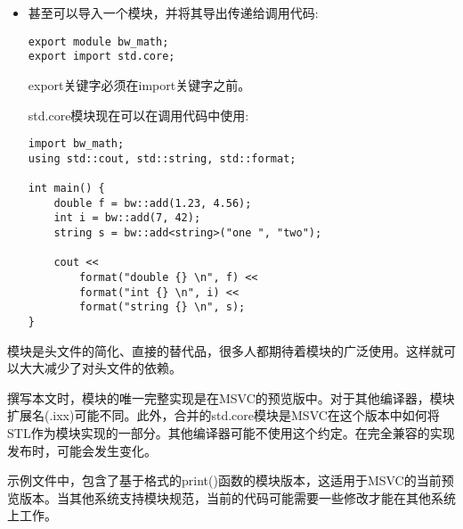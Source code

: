 \begin{itemize}
\item 
甚至可以导入一个模块，并将其导出传递给调用代码:

\begin{lstlisting}[style=styleCXX]
export module bw_math;
export import std.core;
\end{lstlisting}

export关键字必须在import关键字之前。

std.core模块现在可以在调用代码中使用:

\begin{lstlisting}[style=styleCXX]
import bw_math;
using std::cout, std::string, std::format;

int main() {
	double f = bw::add(1.23, 4.56);
	int i = bw::add(7, 42);
	string s = bw::add<string>("one ", "two");
	
	cout <<
		format("double {} \n", f) <<
		format("int {} \n", i) <<
		format("string {} \n", s);
}
\end{lstlisting}

\end{itemize}

模块是头文件的简化、直接的替代品，很多人都期待着模块的广泛使用。这样就可以大大减少了对头文件的依赖。

\begin{tcolorbox}[colback=webgreen!5!white,colframe=webgreen!75!black,title=Note]
撰写本文时，模块的唯一完整实现是在MSVC的预览版中。对于其他编译器，模块扩展名(.ixx)可能不同。此外，合并的std.core模块是MSVC在这个版本中如何将STL作为模块实现的一部分。其他编译器可能不使用这个约定。在完全兼容的实现发布时，可能会发生变化。
\end{tcolorbox}

示例文件中，包含了基于格式的print()函数的模块版本，这适用于MSVC的当前预览版本。当其他系统支持模块规范，当前的代码可能需要一些修改才能在其他系统上工作。
